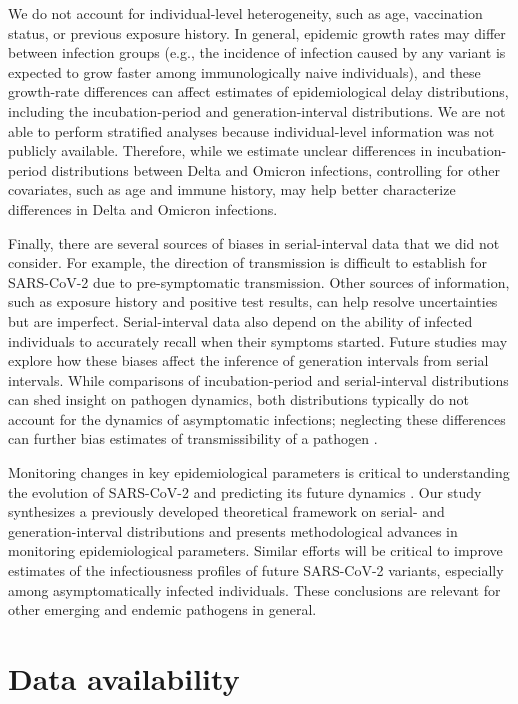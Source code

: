 \documentclass[12pt]{article}
\begin{document}
We do not account for individual-level heterogeneity, such as age, vaccination status, or previous exposure history.
In general, epidemic growth rates may differ between infection groups (e.g., the incidence of infection caused by any variant is expected to grow faster among immunologically naive individuals), and these growth-rate differences can affect estimates of epidemiological delay distributions, including the incubation-period and generation-interval distributions.
We are not able to perform stratified analyses because individual-level information was not publicly available.
Therefore, while we estimate unclear differences in incubation-period distributions between Delta and Omicron infections, controlling for other covariates, such as age and immune history, may help better characterize differences in Delta and Omicron infections.

Finally, there are several sources of biases in serial-interval data that we did not consider.
For example, the direction of transmission is difficult to establish for SARS-CoV-2 due to pre-symptomatic transmission.
Other sources of information, such as exposure history and positive test results, can help resolve uncertainties but are imperfect.
Serial-interval data also depend on the ability of infected individuals to accurately recall when their symptoms started.
Future studies may explore how these biases affect the inference of generation intervals from serial intervals.
While comparisons of incubation-period and serial-interval distributions can shed insight on pathogen dynamics, both distributions typically do not account for the dynamics of asymptomatic infections; neglecting these differences can further bias estimates of transmissibility of a pathogen \citep{park2020time}.

Monitoring changes in key epidemiological parameters is critical to understanding the evolution of SARS-CoV-2 and predicting its future dynamics \citep{kraemer2021monitoring}.
Our study synthesizes a previously developed theoretical framework on serial- and generation-interval distributions and presents methodological advances in monitoring epidemiological parameters.
Similar efforts will be critical to improve estimates of the infectiousness profiles of future SARS-CoV-2 variants, especially among asymptomatically infected individuals.
These conclusions are relevant for other emerging and endemic pathogens in general.

\section*{Data availability}
\end{document}
